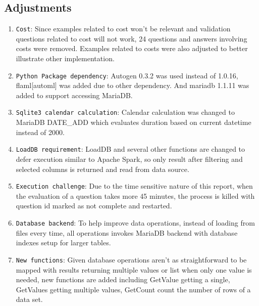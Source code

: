 \documentclass[screen,review]{acmart}
\begin{document}
\subsection{Adjustments}
\begin{enumerate}
  \item{\texttt{Cost}}: Since examples related to cost won't be relevant and validation questions related to 
  cost will not work, 24 questions and answers involving costs were removed. Examples related to costs were 
  also adjusted to better illustrate other implementation.
  \item{\texttt{Python Package dependency}}: Autogen 0.3.2 was used instead of 1.0.16, flaml[automl] 
  was added due to other dependency. And mariadb 1.1.11 was added to support accessing MariaDB.
  \item{\texttt{Sqlite3 calendar calculation}}: Calendar calculation was changed to MariaDB DATE\_ADD which 
  evaluates duration based on current datetime instead of 2000.
  \item{\texttt{LoadDB requirement}}: LoadDB and several other functions are changed to defer execution 
  similar to Apache Spark, so only result after filtering and selected columns is returned and read from data source.
  \item{\texttt{Execution challenge}}: Due to the time sensitive nature of this report, when the evaluation of a question 
  takes more 45 minutes, the process is killed with question id marked as not complete and restarted.
  \item{\texttt{Database backend}}: To help improve data operations, instead of loading from files every time, 
  all operations invokes MariaDB backend with database indexes setup for larger tables. 
  \item{\texttt{New functions}}: Given database operations aren't as straightforward to be mapped with 
  results returning multiple values or list when only one value is needed, new functions are added 
  including GetValue getting a single, GetValues getting multiple values, 
  GetCount count the number of rows of a data set.
\end{enumerate}

\end{document}
